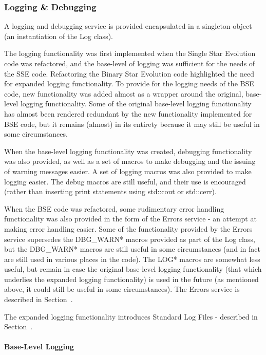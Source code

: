 \subsubsection{Logging \& Debugging}\label{sec:Services_LOGGING}

A logging and debugging service is provided encapsulated in a singleton object (an instantiation of the Log class).

The logging functionality was first implemented when the Single Star Evolution code was refactored, and the base-level of logging was sufficient for the needs of the SSE code.  Refactoring the Binary Star Evolution code highlighted the need for expanded logging functionality.  To provide for the logging needs of the BSE code, new functionality was added almost as a wrapper around the original, base-level logging functionality.  Some of the original base-level logging functionality has almost been rendered redundant by the new functionality implemented for BSE code, but it remains (almost) in its entirety because it may still be useful in some circumstances.

When the base-level logging functionality was created, debugging functionality was also provided, as well as a set of macros to make debugging and the issuing of warning messages easier.  A set of logging macros was also provided to make logging easier.  The debug macros are still useful, and their use is encouraged (rather than inserting print statements using std::cout or std::cerr).

When the BSE code was refactored, some rudimentary error handling functionality was also provided in the form of the Errors service - an attempt at making error handling easier.  Some of the functionality provided by the Errors service supersedes the DBG\_WARN* macros provided as part of the Log class, but the DBG\_WARN* macros are still useful in some circumstances (and in fact are still used in various places in the code).  The LOG* macros are somewhat less useful, but remain in case the original base-level logging functionality (that which underlies the expanded logging functionality) is used in the future (as mentioned above, it could still be useful in some circumstances).  The Errors service is described in Section~.

The expanded logging functionality introduces Standard Log Files - described in Section~.

\paragraph{Base-Level Logging}\label{sec:Base-LevelLogging}\mbox{} \\


